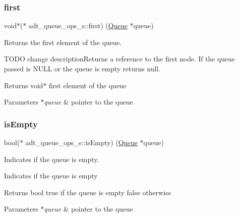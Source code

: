 \subsubsection{\texorpdfstring{first}{first}}
{\footnotesize\ttfamily void$\ast$($\ast$ adt\+\_\+queue\+\_\+ops\+\_\+s\+::first) (\hyperlink{structadt__queue__s}{Queue} $\ast$queue)}



Returns the first element of the queue. 

T\+O\+DO change description\+Returns a reference to the first node. If the queue passed is N\+U\+LL or the queue is empty returns null.

\begin{DoxyReturn}{Returns}
void$\ast$ first element of the queue 
\end{DoxyReturn}

\begin{DoxyParams}{Parameters}
{\em $\ast$queue} & pointer to the queue \\
\hline
\end{DoxyParams}
\mbox{\label{structadt__queue__ops__s_a6930a642b3997d5ca00e811a65d5afa4}} 
\subsubsection{\texorpdfstring{is\+Empty}{isEmpty}}
{\footnotesize\ttfamily bool($\ast$ adt\+\_\+queue\+\_\+ops\+\_\+s\+::is\+Empty) (\hyperlink{structadt__queue__s}{Queue} $\ast$queue)}



Indicates if the queue is empty. 

Indicates if the queue is empty

\begin{DoxyReturn}{Returns}
bool true if the queue is empty false otherwise 
\end{DoxyReturn}

\begin{DoxyParams}{Parameters}
{\em $\ast$queue} & pointer to the queue \\
\hline
\end{DoxyParams}
\mbox{\label{structadt__queue__ops__s_a81cb36c407e0b1434dbe7050796d4647}} 
